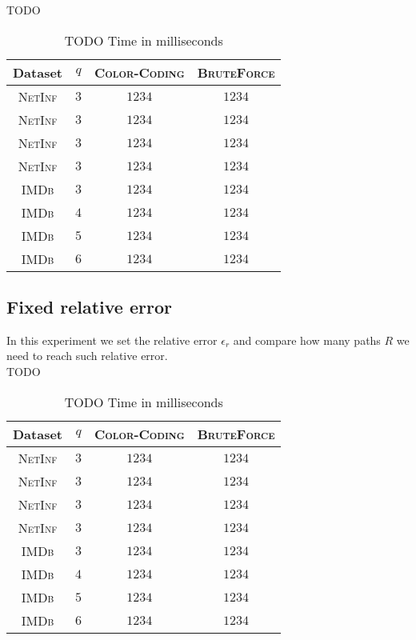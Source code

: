 	TODO
	\begin{table}[h]
		\centering
		\label{my-label}
		\begin{tabular}{|c|c|c|c|}
			\hline
			Dataset 		& $q$ & \textsc{Color-Coding} 	& \textsc{BruteForce} \\ \hline
			\textsc{NetInf}	& $3$ & $1234$					& $1234$ \\ \hline
			\textsc{NetInf}	& $3$ & $1234$					& $1234$ \\ \hline
			\textsc{NetInf}	& $3$ & $1234$					& $1234$ \\ \hline
			\textsc{NetInf}	& $3$ & $1234$					& $1234$ \\ \hline
			\textsc{IMDb}	& $3$ & $1234$					& $1234$ \\ \hline
			\textsc{IMDb}	& $4$ & $1234$					& $1234$ \\ \hline
			\textsc{IMDb}	& $5$ & $1234$					& $1234$ \\ \hline
			\textsc{IMDb}	& $6$ & $1234$					& $1234$ \\ \hline
		\end{tabular}
		\caption{TODO Time in milliseconds}
	\end{table}
		
	\subsection*{Fixed relative error}
	
	In this experiment we set the relative error $\epsilon_{r}$ and compare how many paths $R$ we need to reach such relative error.\\
	
	TODO
	\begin{table}[h]
		\centering
		\label{my-label}
		\begin{tabular}{|c|c|c|c|}
			\hline
			Dataset 		& $q$ & \textsc{Color-Coding} 	& \textsc{BruteForce} \\ \hline
			\textsc{NetInf}	& $3$ & $1234$					& $1234$ \\ \hline
			\textsc{NetInf}	& $3$ & $1234$					& $1234$ \\ \hline
			\textsc{NetInf}	& $3$ & $1234$					& $1234$ \\ \hline
			\textsc{NetInf}	& $3$ & $1234$					& $1234$ \\ \hline
			\textsc{IMDb}	& $3$ & $1234$					& $1234$ \\ \hline
			\textsc{IMDb}	& $4$ & $1234$					& $1234$ \\ \hline
			\textsc{IMDb}	& $5$ & $1234$					& $1234$ \\ \hline
			\textsc{IMDb}	& $6$ & $1234$					& $1234$ \\ \hline
		\end{tabular}
		\caption{TODO Time in milliseconds}
	\end{table}
	
